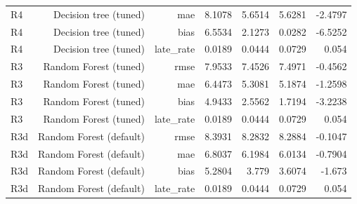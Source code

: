\begin{table}[htbp]
\begin{tabular}{lrrrrrr}
R4 & Decision tree (tuned) & mae & 8.1078 & 5.6514 & 5.6281 & -2.4797 \\
R4 & Decision tree (tuned) & bias & 6.5534 & 2.1273 & 0.0282 & -6.5252 \\
R4 & Decision tree (tuned) & late\_rate & 0.0189 & 0.0444 & 0.0729 & 0.054 \\
R3 & Random Forest (tuned) & rmse & 7.9533 & 7.4526 & 7.4971 & -0.4562 \\
R3 & Random Forest (tuned) & mae & 6.4473 & 5.3081 & 5.1874 & -1.2598 \\
R3 & Random Forest (tuned) & bias & 4.9433 & 2.5562 & 1.7194 & -3.2238 \\
R3 & Random Forest (tuned) & late\_rate & 0.0189 & 0.0444 & 0.0729 & 0.054 \\
R3d & Random Forest (default) & rmse & 8.3931 & 8.2832 & 8.2884 & -0.1047 \\
R3d & Random Forest (default) & mae & 6.8037 & 6.1984 & 6.0134 & -0.7904 \\
R3d & Random Forest (default) & bias & 5.2804 & 3.779 & 3.6074 & -1.673 \\
R3d & Random Forest (default) & late\_rate & 0.0189 & 0.0444 & 0.0729 & 0.054 \\
\bottomrule
\end{tabular}
\par\smallskip\begin{minipage}{\linewidth}\footnotesize \end{minipage}
\end{table}

